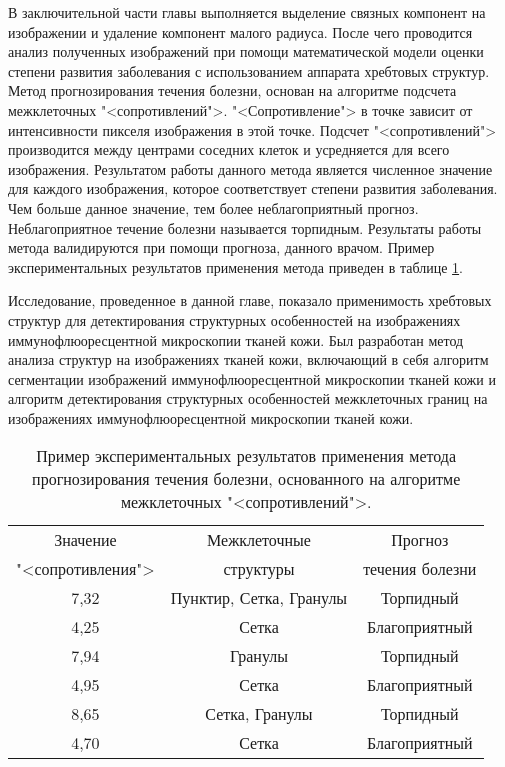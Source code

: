 В заключительной части главы выполняется выделение связных компонент на изображении и удаление компонент малого радиуса. После чего проводится анализ полученных изображений при помощи математической модели оценки степени развития заболевания с использованием аппарата хребтовых структур. Метод прогнозирования течения болезни, основан на алгоритме подсчета межклеточных "<сопротивлений">. "<Сопротивление"> в точке зависит от интенсивности пикселя изображения в этой точке. Подсчет "<сопротивлений"> производится между центрами соседних клеток и усредняется для всего изображения.  Результатом работы данного метода является численное значение для каждого изображения, которое соответствует степени развития заболевания. Чем больше данное значение, тем более неблагоприятный прогноз. Неблагоприятное течение болезни называется торпидным. Результаты работы метода валидируются при помощи прогноза, данного врачом. Пример экспериментальных результатов применения метода приведен в таблице \ref{Table1}.

Исследование, проведенное в данной главе, показало применимость хребтовых структур для детектирования структурных особенностей на изображениях иммунофлюоресцентной микроскопии тканей кожи. Был разработан метод анализа структур на изображениях тканей кожи, включающий в себя алгоритм сегментации изображений иммунофлюоресцентной микроскопии тканей кожи и алгоритм детектирования структурных особенностей межклеточных границ на изображениях иммунофлюоресцентной микроскопии тканей кожи.

\begin{table}[ht!]
\centering
\begin{tabular}{|c|c|c|}
\hline Значение & Межклеточные & Прогноз \\
        "<сопротивления"> & структуры & течения болезни \\
\hline 7,32 & Пунктир, Сетка, Гранулы & Торпидный \\
\hline 4,25 & Сетка & Благоприятный \\
\hline 7,94 & Гранулы & Торпидный \\
\hline 4,95 & Сетка & Благоприятный \\
\hline 8,65 & Сетка, Гранулы & Торпидный \\
\hline 4,70 & Сетка & Благоприятный \\
\hline
\end{tabular}
\caption{Пример экспериментальных результатов применения метода прогнозирования течения болезни, основанного на алгоритме межклеточных "<сопротивлений">.} 
\label{Table1}
\end{table}    

